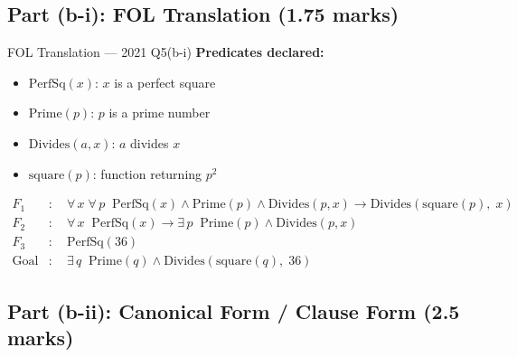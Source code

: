 \documentclass[12pt,a4paper]{article}
\newcommand{\ALL}[1]{\forall\,#1\;}
\newcommand{\EX}[1]{\exists\,#1\;}
\newcommand{\ra}{\rightarrow}
\begin{document}
\subsection{Part (b-i): FOL Translation (1.75 marks)}

\begin{solbox}{FOL Translation --- 2021 Q5(b-i)}
\textbf{Predicates declared:}
\begin{itemize}[noitemsep]
  \item $\mathrm{PerfSq}(x)$: $x$ is a perfect square
  \item $\mathrm{Prime}(p)$: $p$ is a prime number
  \item $\mathrm{Divides}(a,x)$: $a$ divides $x$
  \item $\mathrm{square}(p)$: function returning $p^2$
\end{itemize}

\begin{align}
  F_1&: \quad \ALL{x}\ALL{p}\;\mathrm{PerfSq}(x) \land \mathrm{Prime}(p) \land \mathrm{Divides}(p,x)
          \ra \mathrm{Divides}(\mathrm{square}(p),\;x) \label{f1}\\[4pt]
  F_2&: \quad \ALL{x}\;\mathrm{PerfSq}(x) \ra \EX{p}\;\mathrm{Prime}(p) \land \mathrm{Divides}(p,x) \label{f2}\\[4pt]
  F_3&: \quad \mathrm{PerfSq}(36) \label{f3}\\[4pt]
  \text{Goal}&: \quad \EX{q}\;\mathrm{Prime}(q) \land \mathrm{Divides}(\mathrm{square}(q),\;36) \label{goal}
\end{align}
\end{solbox}

\subsection{Part (b-ii): Canonical Form / Clause Form (2.5 marks)}
\end{document}
